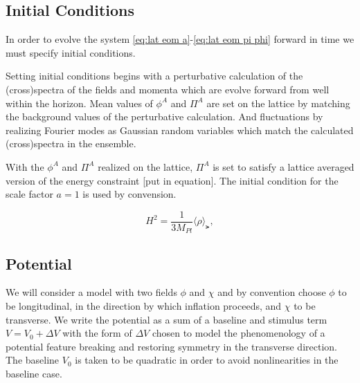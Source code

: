 \subsection{Initial Conditions}
In order to evolve the system \eqref{eq:lat eom a}-\eqref{eq:lat eom pi phi} forward in time we must specify initial conditions.

Setting initial conditions begins with a perturbative calculation of the (cross)spectra of the fields and momenta which are evolve forward from well within the horizon.
Mean values of $\phi^A$ and $\Pi^A$ are set on the lattice by matching the background values of the perturbative calculation.
And fluctuations by realizing Fourier modes as Gaussian random variables which match the calculated (cross)spectra in the ensemble.

With the $\phi^A$ and $\Pi^A$ realized on the lattice, $\Pi^A$ is set to satisfy a lattice averaged version of the energy constraint [put in equation].
The initial condition for the scale factor $a=1$ is used by convension.
  
\begin{equation} \label{eq:energy constraint}
  H^2 = \frac{1}{3M_{Pl}}\langle \rho \rangle_\lat,
\end{equation} 

\subsection{Potential}
\Fpotential



We will consider a model with two fields $\phi$ and $\chi$ and by convention choose $\phi$ to be longitudinal, in the direction by which inflation proceeds, and $\chi$ to be transverse.
We write the potential as a sum of a baseline and stimulus term $V = V_0 + \Delta V$ with the form of $\Delta V$ chosen to model the phenomenology of a potential feature breaking and restoring symmetry in the transverse direction.
The baseline $V_0$ is taken to be quadratic in order to avoid nonlinearities in the baseline case.

